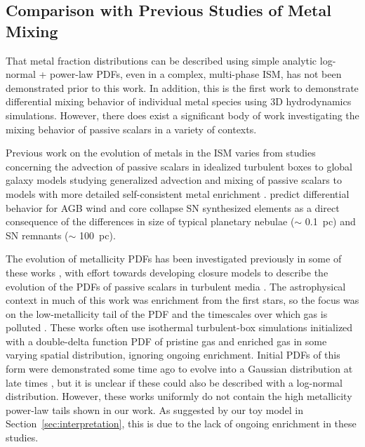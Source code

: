 \documentclass[twocolumn]{aastex61}
\begin{document}
\subsection{
        Comparison with 
Previous Studies of Metal Mixing}
\label{sec:context}
That metal fraction distributions can be described using simple analytic log-normal + power-law PDFs, even in a complex, multi-phase ISM, has not been demonstrated prior to this work.   In addition, this is the first work to demonstrate differential mixing behavior of individual metal species using 3D hydrodynamics simulations. However, there does exist a significant body of work investigating the mixing behavior of passive scalars in a variety of contexts.

Previous work on the evolution of metals in the ISM varies from studies concerning the advection of passive scalars in idealized turbulent boxes \citep[e.g.][]{Pope1991, PanScannapieco2010, PanScannapiecoScalo2012, PanScannapiecoScalo2013, YangKrumholz2012, SurPanScannapieco2014, Colbrook2017}
to global galaxy models studying generalized advection and mixing of passive scalars \citep[e.g.][]{deAvillez2002,Petit2015,Goldbaum2016} to models with more detailed self-consistent metal enrichment \citep[e.g.][]{Revaz2009,Escala2018}.
\cite{KrumholzTing2018} predict differential behavior for AGB wind and core collapse SN synthesized elements as a direct consequence of the differences in size of typical planetary nebulae ($\sim$ 0.1~pc) and SN remnants ($\sim$ 100~pc).

The evolution of metallicity PDFs has been investigated previously in some of these works \citep[see ][ and references therein]{PanScannapiecoScalo2012,PanScannapiecoScalo2013}, with effort towards developing closure models to describe the evolution of the PDFs of passive scalars in turbulent media \citep[e.g.][]{EswaranPope1988,Chen1989,Pope1991}. The astrophysical context in much of this work was enrichment from the first stars, so the focus was on the low-metallicity tail of the PDF and the timescales over which gas is polluted \citep[e.g.][]{PanScannapiecoScalo2013,Sarmento2017}. These works often use isothermal turbulent-box simulations initialized with a double-delta function PDF of pristine gas and enriched gas in some varying spatial distribution, ignoring ongoing enrichment. Initial PDFs of this form were demonstrated some time ago to evolve into a Gaussian distribution at late times \citep{EswaranPope1988}, but it is unclear if these could also be described with a log-normal distribution. However, these works uniformly do not contain the high metallicity power-law tails shown in our work. As suggested by our toy model in Section~\ref{sec:interpretation}, this is due to the lack of ongoing enrichment in these studies.
\end{document}
